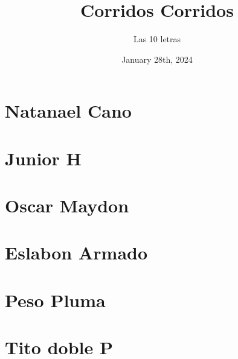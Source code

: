 \documentclass{article}
\title{Corridos Corridos}
\date{January 28th, 2024}
\author{Las 10 letras}
\begin{document}
\maketitle{}
\tableofcontents

\renewcommand\guitarPreAccord{\color{amaranth}\footnotesize\strut\bfseries}

%
\newpage
\section{Natanael Cano}
















\section{Junior H}












\section{Oscar Maydon}


\section{Eslabon Armado}





\section{Peso Pluma}	



\section{Tito doble P}



\end{document}
